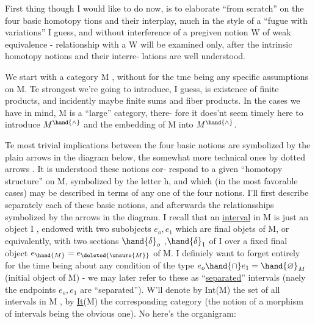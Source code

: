 
 First thing though I would like to do now,  is to elaborate ``from
scratch'' on the four basic homotopy tions and their interplay,  much in
the style of a ``fugue with variations'' I guess,  and without interference
of a pregiven notion W of weak equivalence  -  relationship with a W will
be examined only,  after the intrinsic homotopy notions and their interre-%
lations are well understood.

We start with a category M ,  without for the tme being any specific
assumptions on M.  Te strongest we're going to introduce,  I guess,  is
existence of finite products,  and incidently maybe finite sums and fiber
products.  In the cases we have in mind,  M is a ``large'' category,  there-%
fore it does'nt seem timely here to introduce $M^{\hand{\wedge}}$ and the embedding of M
into $M^{\hand{\wedge}}$.

Te most trivial implications between the four basic  notions are
symbolized by the plain arrows in the diagram below,  the somewhat more
technic\hand{\ensuremath{\smile}}al ones by dotted arrows \hand{*}.  It is understood these notions cor-%
respond to a given ``homotopy structure'' on M,  symbolized by the letter h,
and which (in  the most favorable cases)  may be described  in terms of any
one of the four notions.  I'll first describe separately each of these
basic notions,  and afterwards the relationsships  symbolized by
the arrows in the diagram.  I recall that an \uline{interval} in M is just an
object  I ,  endowed with two subobjects $e_o,e_1$ which are final objets of
M,  or equivalently,  with two sections $\hand{\ensuremath{\delta}}_o$ ,$\hand{\ensuremath{\delta}}_1$ of I over a fixed final
object $e_{\hand{M}}=e_{\deleted{\unsure{M}}}$ of M.  I definiely want to forget entirely for the time being
about any condition of the type $e_o\hand{\ensuremath{\cap}}e_1 = \hand{\varnothing}_M$  (initial object of M)  -
we may later refer to these as ``\uline{separated}'' intervals (naely the endpoints
$e_o,e_1$ are ``separated'').  W'll denote by Int(M) the set of all intervals
in M ,  by \uline{It}(M) the corresponding category (the notion of a morphism of
intervals being the obvious one).  No here's the organigram:

